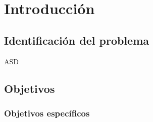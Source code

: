 
\chapter{Introducción}

\section{Identificación del problema}

ASD \cite{minenergia14}

\section{Objetivos}

\subsection{Objetivos específicos}

